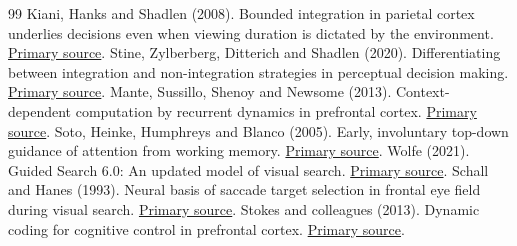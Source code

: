 \begin{thebibliography}{99}
 Kiani, Hanks and Shadlen (2008). Bounded integration in parietal cortex underlies decisions even when viewing duration is dictated by the environment. \href{https://pmc.ncbi.nlm.nih.gov/articles/PMC6670720/}{Primary source}.
 Stine, Zylberberg, Ditterich and Shadlen (2020). Differentiating between integration and non-integration strategies in perceptual decision making. \href{https://pubmed.ncbi.nlm.nih.gov/32338595/}{Primary source}.
 Mante, Sussillo, Shenoy and Newsome (2013). Context-dependent computation by recurrent dynamics in prefrontal cortex. \href{https://pubmed.ncbi.nlm.nih.gov/24201281/}{Primary source}.
 Soto, Heinke, Humphreys and Blanco (2005). Early, involuntary top-down guidance of attention from working memory. \href{https://www.comp-psych.bham.ac.uk/publications/soto_jep2005.pdf}{Primary source}.
 Wolfe (2021). Guided Search 6.0: An updated model of visual search. \href{https://doi.org/10.3758/s13423-020-01859-9}{Primary source}.
 Schall and Hanes (1993). Neural basis of saccade target selection in frontal eye field during visual search. \href{https://pubmed.ncbi.nlm.nih.gov/8247155/}{Primary source}.
 Stokes and colleagues (2013). Dynamic coding for cognitive control in prefrontal cortex. \href{https://pmc.ncbi.nlm.nih.gov/articles/PMC3898895/}{Primary source}.
\end{thebibliography}